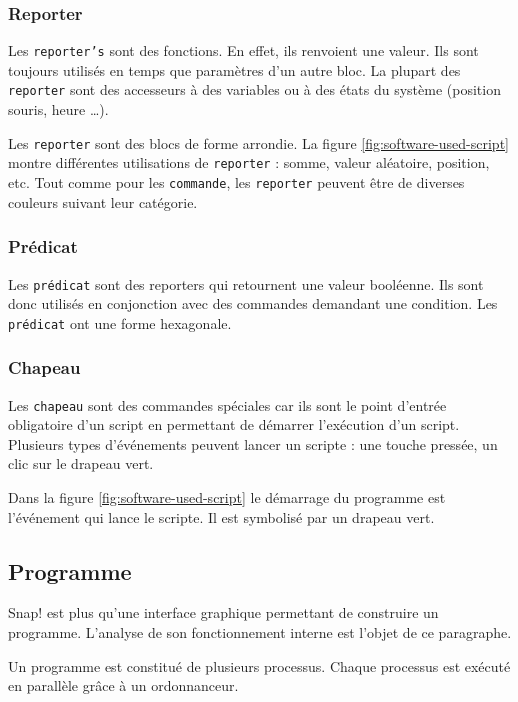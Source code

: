 \subsubsection{Reporter}
Les \texttt{reporter's} sont des fonctions. En effet, ils renvoient une valeur. Ils sont toujours utilisés en temps que paramètres d'un autre bloc. La plupart des \texttt{reporter} sont des accesseurs à des variables ou à des états du système (position souris, heure \ldots). 

Les \texttt{reporter} sont des blocs de forme arrondie. La figure \ref{fig:software-used-script} montre différentes utilisations de \texttt{reporter} : somme, valeur aléatoire, position, etc. Tout comme pour les \texttt{commande}, les \texttt{reporter} peuvent être de diverses couleurs suivant leur catégorie.

\subsubsection{Prédicat}
Les \texttt{prédicat} sont des reporters qui retournent une valeur booléenne. Ils sont donc utilisés en conjonction avec des commandes demandant une condition. Les \texttt{prédicat} ont une forme hexagonale.

\subsubsection{Chapeau}
Les \texttt{chapeau} sont des commandes spéciales car ils sont le point d'entrée obligatoire d'un script en permettant de démarrer l'exécution d'un script. Plusieurs types d'événements peuvent lancer un scripte : une touche pressée, un clic sur le drapeau vert.

Dans la figure \ref{fig:software-used-script} le démarrage du programme est l'événement qui lance le scripte. Il est symbolisé par un drapeau vert.

\subsection{Programme}
Snap! est plus qu'une interface graphique permettant de construire un programme. L'analyse de son fonctionnement interne est l'objet de ce paragraphe.

Un programme est constitué de plusieurs processus. Chaque processus est exécuté en parallèle grâce à un ordonnanceur.

